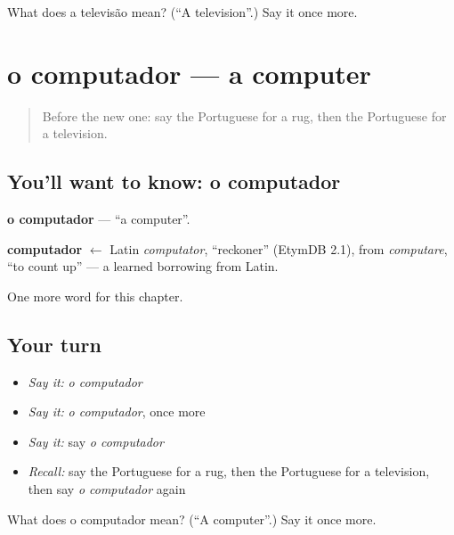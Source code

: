 \begin{tcolorbox}[breakable,colback=teal!4,colframe=teal!35!black,title={Before you move on}]
What does a televisão mean? (\textquotedblleft{}A television\textquotedblright{}.) Say it once more.
\end{tcolorbox}
\section[o computador]{o computador — a computer}

\label{lesson:PT-C93-computador}



\begin{quote}
Before the new one: say the Portuguese for a rug, then the Portuguese for a television.
\end{quote}

\subsection*{You'll want to know: o computador}
\textbf{o computador} — \textquotedblleft{}a computer\textquotedblright{}.

\begin{cousinweb}
\textbf{computador} $\leftarrow$ Latin \emph{computator}, \textquotedblleft{}reckoner\textquotedblright{} (EtymDB 2.1), from \emph{computare}, \textquotedblleft{}to count up\textquotedblright{} — a learned borrowing from Latin.
\end{cousinweb}

\begin{grammarlens}[title={What you've built}]
One more word for this chapter.
\end{grammarlens}

\subsection*{Your turn}
\begin{itemize}
\raggedright
  \item \emph{Say it:} \emph{o computador}
  \item \emph{Say it:} \emph{o computador}, once more
  \item \emph{Say it:} say \emph{o computador}
  \item \emph{Recall:} say the Portuguese for a rug, then the Portuguese for a television, then say \emph{o computador} again
\end{itemize}

\begin{tcolorbox}[breakable,colback=teal!4,colframe=teal!35!black,title={Before you move on}]
What does o computador mean? (\textquotedblleft{}A computer\textquotedblright{}.) Say it once more.
\end{tcolorbox}
